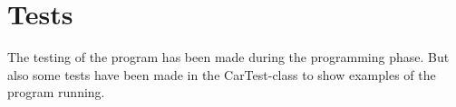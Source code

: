 \section{Tests}
The testing of the program has been made during the programming phase. But also some tests have been made in the CarTest-class to show examples of the program running. \\
